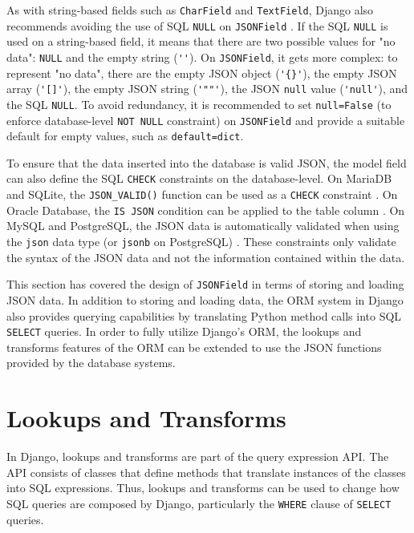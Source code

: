 As with string-based fields such as \verb|CharField| and \verb|TextField|,
Django also recommends avoiding the use of SQL \verb|NULL| on \verb|JSONField|
\cite{django:model_fields}. If the SQL \verb|NULL| is used on a string-based
field, it means that there are two possible values for "no data": \verb|NULL|
and the empty string (\verb|''|). On \verb|JSONField|, it gets more complex:
to represent "no data", there are the empty JSON object (\verb|'{}'|), the
empty JSON array (\verb|'[]'|), the empty JSON string (\verb|'""'|), the JSON
\verb|null| value (\verb|'null'|), and the SQL \verb|NULL|. To avoid
redundancy, it is recommended to set \verb|null=False| (to enforce
database-level \verb|NOT NULL| constraint) on \verb|JSONField| and provide
a suitable default for empty values, such as \verb|default=dict|.

To ensure that the data inserted into the database is valid JSON, the model
field can also define the SQL \verb|CHECK| constraints on the database-level.
On MariaDB and SQLite, the \verb|JSON_VALID()| function can be used as a
\verb|CHECK| constraint \cite{mariadb:json_valid, sqlite:json1}. On Oracle
Database, the \verb|IS JSON| condition can be applied to the table column
\cite{oracle:is_json}. On MySQL and PostgreSQL, the JSON data is automatically
validated when using the \verb|json| data type (or \verb|jsonb| on PostgreSQL)
\cite{postgres:json, mysql:json}. These constraints only validate the syntax of
the JSON data and not the information contained within the data.

This section has covered the design of \verb|JSONField| in terms of storing and
loading JSON data. In addition to storing and loading data, the ORM system in
Django also provides querying capabilities by translating Python method calls
into SQL \verb|SELECT| queries. In order to fully utilize Django's ORM, the
lookups and transforms features of the ORM can be extended to use the JSON
functions provided by the database systems.

\section{ Lookups and Transforms}

In Django, lookups and transforms are part of the query expression API. The
API consists of classes that define methods that translate instances of the
classes into SQL expressions. Thus, lookups and transforms can be used to
change how SQL queries are composed by Django, particularly the \verb|WHERE|
clause of \verb|SELECT| queries.

